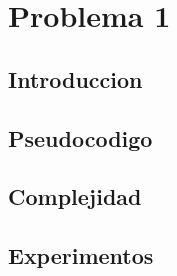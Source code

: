 
\section{Problema 1}


\subsection{Introduccion}
\subsection{Pseudocodigo}
\subsection{Complejidad}
\subsection{Experimentos}
